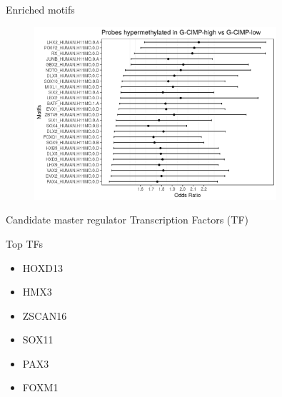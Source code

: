 \documentclass[slidestop,compress,11pt,xcolor=dvipsnames]{beamer}
\begin{document}



\begin{frame}{Enriched motifs}
 \begin{figure}[ht!]
  \centering
  \includegraphics[width=0.8\textwidth]{glioma/or.png}
 \end{figure}
\end{frame}

\begin{frame}{Candidate master regulator Transcription Factors (TF) }
\begin{block}{Top TFs}
  \begin{itemize}
    \item  HOXD13
    \item  HMX3
    \item  ZSCAN16
    \item  SOX11
    \item  PAX3
    \item  FOXM1
  \end{itemize}
\end{block}
\end{frame}
\end{document}
